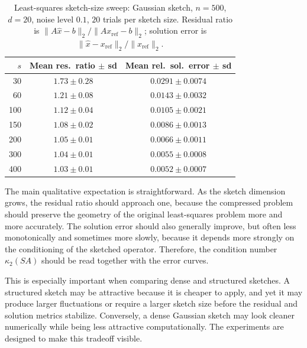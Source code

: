 \begin{table}[t]
	\centering
	\caption{Least-squares sketch-size sweep: Gaussian sketch, \(n=500\), \(d=20\), noise level \(0.1\), \(20\) trials per sketch size. Residual ratio is \(\|A\hat x - b\|_2 / \|A x_{\mathrm{ref}} - b\|_2\); solution error is \(\|\hat x - x_{\mathrm{ref}}\|_2 / \|x_{\mathrm{ref}}\|_2\).}
	\label{tab:ls_sweep}
	\begin{tabular}{rcc}
		\toprule
		\(s\) & Mean res.\ ratio \(\pm\) sd & Mean rel.\ sol.\ error \(\pm\) sd \\
		\midrule
		30    & \(1.73 \pm 0.28\)           & \(0.0291 \pm 0.0074\)             \\
		60    & \(1.21 \pm 0.08\)           & \(0.0143 \pm 0.0032\)             \\
		100   & \(1.12 \pm 0.04\)           & \(0.0105 \pm 0.0021\)             \\
		150   & \(1.08 \pm 0.02\)           & \(0.0086 \pm 0.0013\)             \\
		200   & \(1.05 \pm 0.01\)           & \(0.0066 \pm 0.0011\)             \\
		300   & \(1.04 \pm 0.01\)           & \(0.0055 \pm 0.0008\)             \\
		400   & \(1.03 \pm 0.01\)           & \(0.0052 \pm 0.0007\)             \\
		\bottomrule
	\end{tabular}
\end{table}

The main qualitative expectation is straightforward. As the sketch dimension
grows, the residual ratio should approach one, because the compressed problem
should preserve the geometry of the original least-squares problem more and more
accurately. The solution error should also generally improve, but often less
monotonically and sometimes more slowly, because it depends more strongly on
the conditioning of the sketched operator. Therefore, the condition number
\(\kappa_2(SA)\) should be read together with the error curves.

This is especially important when comparing dense and structured sketches. A
structured sketch may be attractive because it is cheaper to apply, and yet it may
produce larger fluctuations or require a larger sketch size before the residual and
solution metrics stabilize. Conversely, a dense Gaussian sketch may look cleaner
numerically while being less attractive computationally. The experiments are
designed to make this tradeoff visible.

